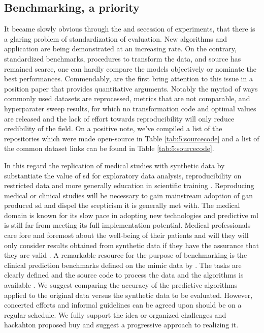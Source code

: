 \subsection{Benchmarking, a priority}
It became slowly obvious through the and secession of experiments, that there is a glaring problem of standardization of evaluation. New algorithms and application are being demonstrated at an increasing rate. On the contrary, standardized benchmarks, procedures to transform the data, and source has remained scarce, one can hardly compare the models objectively or nominate the best performances. Commendably, \citeauthor{Camino2020bench} are the first bring attention to this issue in a position paper that provides quantitative arguments. Notably the myriad of ways commonly used datasets are reprocessed, metrics that are not comparable, and hyperparater sweep results, for which no transformation code and optimal values are released and the lack of effort towards reproducibility will only reduce credibility of the field. On a positive note, we've compiled a list of the repositories which were made open-source in Table \ref{tab:5:sourcecode} and a list of the common dataset links can be found in Table \ref{tab:5:sourcecode}.\par
In this regard the replication of medical studies with synthetic data by \citeauthor{Yale_2020} substantiate the value of \gls{sd} for exploratory data analysis, reproducibility on restricted data and more generally education in scientific training \cite{Reiner_Benaim2020-lx}. Reproducing medical or clinical studies will be necessary to gain mainstream adoption of \gls{gan} produced \gls{sd} and dispel the scepticism it is generally met with. The medical domain is known for its slow pace in adopting new technologies and predictive \gls{ml} is still far from meeting its full implementation potential. Medical professionals care fore and foremost about the well-being of their patients and will they will only consider results obtained from synthetic data if they have the assurance that they are valid \cite{Rankin2020}.  A remarkable resource for the purpose of benchmarking is the clinical prediction benchmarks defined on the \gls{mimic} data by \citeauthor{harutyunyan_multitask_2019}. The tasks are clearly defined and the source code to process the data and the algorithms is available \cite{harutyunyan_multitask_2019}. We suggest comparing the accuracy of the predictive algorithms applied to the original data versus the synthetic data to be evaluated. However, concerted efforts and informal guidelines can be agreed upon should be on a regular schedule. We fully support the idea or organized challenges and hackahton proposed buy \cite{Camino2020bench} and suggest a progressive approach to realizing it.\par

